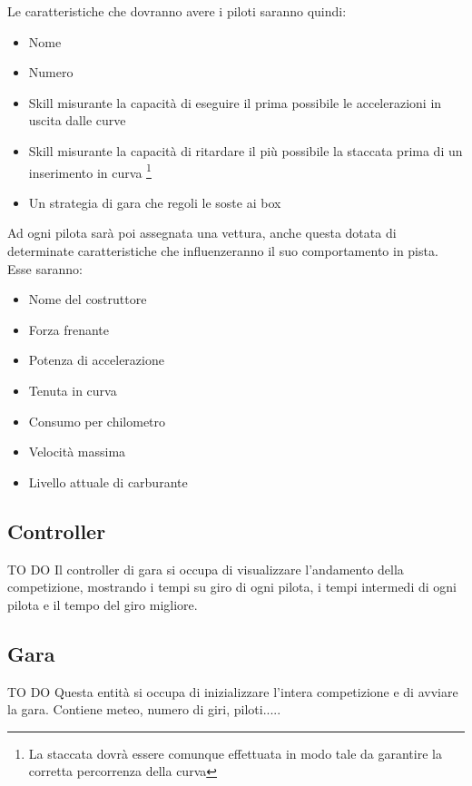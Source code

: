 \documentclass[a4paper,11pt, twoside]{book}
\begin{document}
        Le caratteristiche che dovranno avere i piloti saranno quindi:
        
        \begin{itemize}
	  \item Nome 
	  \item Numero
	  \item Skill misurante la capacità di eseguire il prima possibile le accelerazioni in uscita dalle curve
	  \item Skill misurante la capacità di ritardare il più possibile la staccata prima di un inserimento in curva 
	        \footnote{La staccata dovrà essere comunque effettuata in modo tale da garantire la 
	        corretta percorrenza della curva}
	  \item Un strategia di gara che regoli le soste ai box
	\end{itemize}
	
        
        Ad ogni pilota sarà poi assegnata una vettura, anche questa dotata di determinate caratteristiche che influenzeranno il suo
        comportamento in pista. Esse saranno:
        
        \begin{itemize}
          \item Nome del costruttore
          \item Forza frenante
          \item Potenza di accelerazione
          \item Tenuta in curva
          \item Consumo per chilometro
          \item Velocità massima
          \item Livello attuale di carburante
        \end{itemize}

      \subsection{Controller}
        \<TO DO\>
        Il controller di gara si occupa di visualizzare l'andamento della competizione, mostrando
        i tempi su giro di ogni pilota, i tempi intermedi di ogni pilota e il tempo del giro migliore.
        
      \subsection{Gara}
        \<TO DO\>
        Questa entità si occupa di inizializzare l'intera competizione e di avviare la gara.
        Contiene meteo, numero di giri, piloti.....
          
\end{document}

